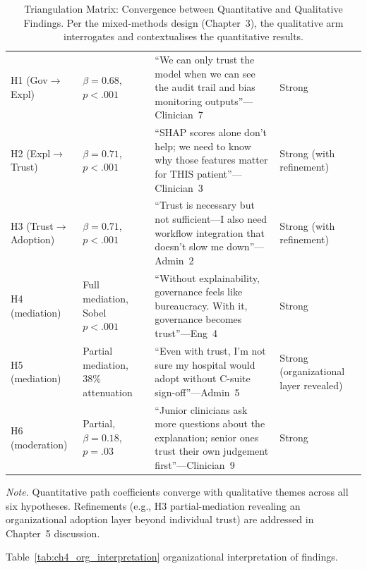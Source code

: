 {\tablestripes\tablefontsize
{}
\begin{xltabular}{\textwidth}{@{} >{\raggedright\arraybackslash}p{2.5cm} p{2.5cm} p{6.5cm} >{\raggedright\arraybackslash}p{2.7cm} @{}}
\caption[Triangulation: Quantitative--Qualitative Convergence]{Triangulation Matrix: Convergence between Quantitative and Qualitative Findings. Per the mixed-methods design (Chapter~3), the qualitative arm interrogates and contextualises the quantitative results.}\label{tab:ch4_triangulation} \\
\toprule
{} &  &  &  \\
\midrule
\endfirsthead
\endhead
\bottomrule
\endlastfoot
H1 (Gov$\to$Expl)        & $\beta=0.68$, $p<.001$ & ``We can only trust the model when we can see the audit trail and bias monitoring outputs''---Clinician~7  & Strong \\
H2 (Expl$\to$Trust)      & $\beta=0.71$, $p<.001$ & ``SHAP scores alone don't help; we need to know why those features matter for THIS patient''---Clinician~3 & Strong (with refinement) \\
H3 (Trust$\to$Adoption)  & $\beta=0.71$, $p<.001$ & ``Trust is necessary but not sufficient---I also need workflow integration that doesn't slow me down''---Admin~2 & Strong (with refinement) \\
H4 (mediation)           & Full mediation, Sobel $p<.001$ & ``Without explainability, governance feels like bureaucracy. With it, governance becomes trust''---Eng~4   & Strong \\
H5 (mediation)           & Partial mediation, 38\% attenuation & ``Even with trust, I'm not sure my hospital would adopt without C-suite sign-off''---Admin~5             & Strong (organizational layer revealed) \\
H6 (moderation)          & Partial, $\beta=0.18$, $p=.03$ & ``Junior clinicians ask more questions about the explanation; senior ones trust their own judgement first''---Clinician~9 & Strong \\
\end{xltabular}}
\vspace{0.4em}
\noindent\textit{Note.} Quantitative path coefficients converge with qualitative themes across all six hypotheses. Refinements (e.g., H3 partial-mediation revealing an organizational adoption layer beyond individual trust) are addressed in Chapter~5 discussion.

\noindent Table~\ref{tab:ch4_org_interpretation} organizational interpretation of findings.

